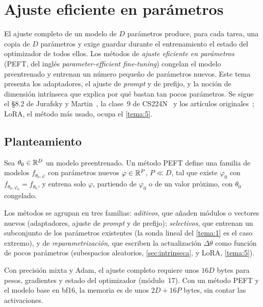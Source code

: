 \chapter{Ajuste eficiente en parámetros}
\label{tema:4}

El ajuste completo de un modelo de $D$ parámetros produce, para cada tarea, una copia de $D$ parámetros y exige guardar durante el entrenamiento el estado del optimizador de todos ellos. Los métodos de \emph{ajuste eficiente en parámetros} (PEFT, del inglés \emph{parameter-efficient fine-tuning}) congelan el modelo preentrenado y entrenan un número pequeño de parámetros nuevos. Este tema presenta los adaptadores, el ajuste de \emph{prompt} y de prefijo, y la noción de dimensión intrínseca que explica por qué bastan tan pocos parámetros. Se sigue el §8.2 de Jurafsky y Martin~\cite{jm3}, la clase~9 de CS224N~\cite{cs224n} y los artículos originales~\cite{houlsby,lester,li-liang,li-intrinsic,aghajanyan}; LoRA, el método más usado, ocupa el \cref{tema:5}.

\section{Planteamiento}

\begin{definicion}\label{def:peft}
Sea $\theta_0\in\mathbb{R}^{D}$ un modelo preentrenado. Un método PEFT define una familia de modelos $f_{\theta_0,\varphi}$ con parámetros nuevos $\varphi\in\mathbb{R}^{P}$, $P\ll D$, tal que existe $\varphi_0$ con $f_{\theta_0,\varphi_0}=f_{\theta_0}$, y entrena solo $\varphi$, partiendo de $\varphi_0$ o de un valor próximo, con $\theta_0$ congelado.
\end{definicion}

Los métodos se agrupan en tres familias: \emph{aditivos}, que añaden módulos o vectores nuevos (adaptadores, ajuste de \emph{prompt} y de prefijo); \emph{selectivos}, que entrenan un subconjunto de los parámetros existentes (la sonda lineal del \cref{tema:1} es el caso extremo), y de \emph{reparametrización}, que escriben la actualización $\Delta\theta$ como función de pocos parámetros (subespacios aleatorios, \cref{sec:intrinseca}, y LoRA, \cref{tema:5}).

\begin{proposicion}\label{prop:memoria-peft}
Con precisión mixta y Adam, el ajuste completo requiere unos $16D$ bytes para pesos, gradientes y estado del optimizador (módulo~17). Con un método PEFT y el modelo base en bf16, la memoria es de unos $2D+16P$ bytes, sin contar las activaciones.
\end{proposicion}

